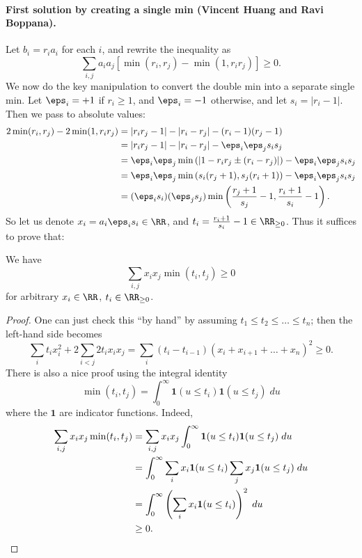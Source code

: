 \documentclass[11pt]{scrartcl}
\begin{document}
\paragraph{First solution by creating a single min (Vincent Huang and Ravi Boppana).}
Let $b_i = r_i a_i$ for each $i$,
and rewrite the inequality as
\[ \sum_{i,j} a_i a_j \left[
  \min (r_i, r_j) - \min(1, r_i r_j) \right] \ge 0. \]
We now do the key manipulation to convert the double min
into a separate single min.
Let $\eps_i = +1$ if $r_i \ge 1$, and $\eps_i = -1$ otherwise,
and let $s_i = |r_i-1|$.
Then we pass to absolute values:
\begin{align*}
  2\min(r_i,r_j) - 2\min(1,r_i r_j)
  &= |r_i r_j-1| - |r_i-r_j|  - (r_i-1)(r_j-1) \\
  &= |r_i r_j-1| - |r_i-r_j| - \eps_i \eps_j s_i s_j \\
  &= \eps_i \eps_j \min \left( |1-r_i r_j \pm (r_i-r_j)| \right)
  - \eps_i \eps_j s_i s_j \\
  &= \eps_i \eps_j \min \left( s_i(r_j+1), s_j(r_i+1) \right)
  - \eps_i \eps_j s_i s_j \\
  &= (\eps_i s_i)(\eps_j s_j)
  \min \left( \frac{r_j+1}{s_j}-1, \frac{r_i+1}{s_i}-1  \right).
\end{align*}
So let us denote $x_i = a_i \eps_i s_i \in \RR$,
and $t_i = \frac{r_i+1}{s_i}-1 \in \RR_{\ge 0}$.
Thus it suffices to prove that:
\begin{claim*}
  We have
  \[ \sum_{i,j} x_i x_j \min(t_i, t_j) \ge 0 \]
  for arbitrary $x_i \in \RR$, $t_i \in \RR_{\ge 0}$.
\end{claim*}
\begin{proof}
  One can just check this ``by hand''
  by assuming $t_1 \le t_2 \le \dots \le t_n$;
  then the left-hand side becomes
  \[ \sum_i t_i x_i^2 + 2 \sum_{i < j} 2 t_i x_i x_j
    = \sum_i (t_i - t_{i-1}) (x_i + x_{i+1} + \dots + x_n)^2 \ge 0.  \]
  There is also a nice proof using the integral identity
  \[ \min(t_i, t_j) = \int_0^\infty \mathbf1(u \le t_i) \mathbf1(u \le t_j) \; du \]
  where the $\mathbf1$ are indicator functions.
  Indeed,
  \begin{align*}
    \sum_{i,j} x_i x_j \min(t_i, t_j)
    &= \sum_{i,j} x_i x_j \int_0^\infty \mathbf1(u \le t_i) \mathbf1(u \le t_j) \; du \\
    &= \int_0^\infty \sum_i x_i \mathbf1(u \le t_i)
    \sum_j x_j \mathbf1(u \le t_j) \; du \\
    &= \int_0^\infty \left( \sum_i x_i \mathbf1(u \le t_i) \right)^2 \; du \\
    &\ge 0. \qedhere
  \end{align*}
\end{proof}
\end{document}
